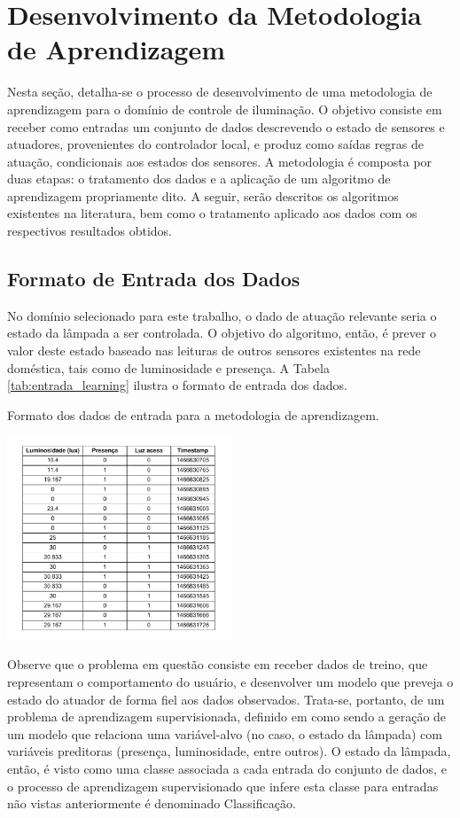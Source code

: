 \section{Desenvolvimento da Metodologia de Aprendizagem}
Nesta seção, detalha-se o processo de desenvolvimento de uma metodologia de aprendizagem para o domínio de controle de iluminação. O objetivo consiste em receber como entradas um conjunto de dados descrevendo o estado de sensores e atuadores, provenientes do controlador local, e produz como saídas regras de atuação, condicionais aos estados dos sensores. A metodologia é composta por duas etapas: o tratamento dos dados e a aplicação de um algoritmo de aprendizagem propriamente dito. A seguir, serão descritos os algoritmos existentes na literatura, bem como o tratamento aplicado aos dados com os respectivos resultados obtidos.

\subsection{Formato de Entrada dos Dados}\label{subsec:formatoentrada}
No domínio selecionado para este trabalho, o dado de atuação relevante seria o estado da lâmpada a ser controlada. O objetivo do algoritmo, então, é prever o valor deste estado baseado nas leituras de outros sensores existentes na rede doméstica, tais como de luminosidade e presença. A Tabela \ref{tab:entrada_learning} ilustra o formato de entrada dos dados.

\begin{table}[h]
	\centering
	\caption{Formato dos dados de entrada para a metodologia de aprendizagem.}\smallskip
	\label{tab:entrada_learning}
	\includegraphics[width=0.5\textwidth]{tabelas/raw_table.pdf}
\end{table}

Observe que o problema em questão consiste em receber dados de treino, que representam o comportamento do usuário, e desenvolver um modelo que preveja o estado do atuador de forma fiel aos dados observados. Trata-se, portanto, de um problema de aprendizagem supervisionada, definido em \cite{james2014} como sendo a geração de um modelo que relaciona uma variável-alvo (no caso, o estado da lâmpada) com variáveis preditoras (presença, luminosidade, entre outros). O estado da lâmpada, então, é visto como uma classe associada a cada entrada do conjunto de dados, e o processo de aprendizagem supervisionado que infere esta classe para entradas não vistas anteriormente é denominado Classificação.

